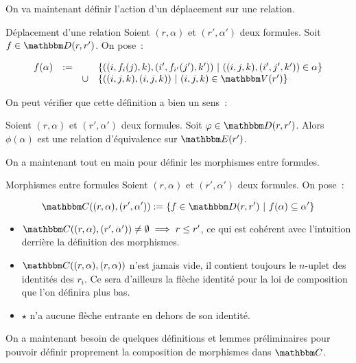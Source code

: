 On va maintenant définir l'action d'un déplacement sur une relation.

\begin{defi}{Déplacement d'une relation}
    Soient $(r,\alpha)$ et $(r',\alpha')$ deux formules. Soit $f\in\D(r,r')$. On pose~:

    \[ \begin{array}{rccl}
          f(\alpha) &:= & & \{ ((i,f_i(j), k), (i', f_{i'}(j'), k'))
                              ~|~ ((i,j,k), (i',j',k'))\in \alpha \} \\
                    &   & \cup &\{ ((i,j,k), (i,j,k)) ~|~ (i,j,k)\in\V(r') \} \\
    \end{array} \]
\end{defi}

On peut vérifier que cette définition a bien un sens~:

\begin{lem}
    Soient $(r,\alpha)$ et $(r',\alpha')$ deux formules. Soit $\phi\in\D(r,r')$.
    Alors $\phi(\alpha)$ est une relation d'équivalence sur $\E(r')$.
\end{lem}

On a maintenant tout en main pour définir les morphismes entre formules.

\begin{defi}{Morphismes entre formules}
    Soient $(r,\alpha)$ et $(r',\alpha')$ deux formules. On pose~:

    \[\C((r,\alpha),(r',\alpha')) := \{ f\in\D(r,r') ~|~
                                        f(\alpha)\subseteq \alpha' \}\]
\end{defi}

\begin{rem}\begin{itemize}
    \item $\C((r,\alpha), (r',\alpha'))\neq\emptyset \implies r\leq r'$, ce qui
        est cohérent avec l'intuition derrière la définition des morphismes.
    \item $\C((r,\alpha), (r,\alpha))$ n'est jamais vide, il contient toujours le $n$-uplet
        des identités des $r_i$. Ce sera d'ailleurs la flèche identité pour la loi
        de composition que l'on définira plus bas.
    \item $\star$ n'a aucune flèche entrante en dehors de son identité.
\end{itemize}\end{rem}

On a maintenant besoin de quelques définitions et lemmes préliminaires pour pouvoir
définir proprement la composition de morphismes dans $\C$.


